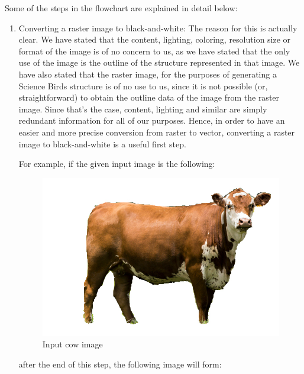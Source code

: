 \documentclass{dalthesis}
\begin{document}
Some of the steps in the flowchart are explained in detail below:

\begin{enumerate}
  \item Converting a raster image to black-and-white: The reason for this is actually clear. We have stated that the content, lighting, coloring, resolution size or format of the image is of no concern to us, as we have stated that the only use of the image is the outline of the structure represented in that image. We have also stated that the raster image, for the purposes of generating a Science Birds structure is of no use to us, since it is not possible (or, straightforward) to obtain the outline data of the image from the raster image. Since that's the case, content, lighting and similar are simply redundant information for all of our purposes. Hence, in order to have an easier and more precise conversion from raster to vector, converting a raster image to black-and-white is a useful first step.

  For example, if the given input image is the following:

  \begin{figure}[H]
    \centering
		\caption{Input cow image}
    \includegraphics[width=\textwidth,height=\textheight,keepaspectratio]{process/cow.jpg}
  \end{figure}

  after the end of this step, the following image will form:


\end{enumerate}
\end{document}
